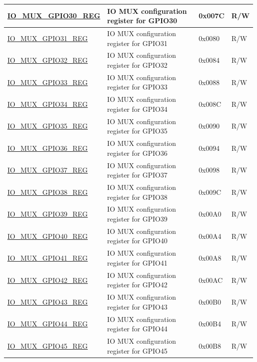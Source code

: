 \begin{longtable}{ | p{6cm} | p{7.2cm} | p{1.3cm} | p{1cm} | }
\hyperref[regdesc:IOMUXGPIONREG]{IO\_MUX\_GPIO30\_REG} & IO MUX configuration register for GPIO30 & 0x007C & R/W \\ \hline
\hyperref[regdesc:IOMUXGPIONREG]{IO\_MUX\_GPIO31\_REG} & IO MUX configuration register for GPIO31 & 0x0080 & R/W \\ \hline
\hyperref[regdesc:IOMUXGPIONREG]{IO\_MUX\_GPIO32\_REG} & IO MUX configuration register for GPIO32 & 0x0084 & R/W \\ \hline
\hyperref[regdesc:IOMUXGPIONREG]{IO\_MUX\_GPIO33\_REG} & IO MUX configuration register for GPIO33 & 0x0088 & R/W \\ \hline
\hyperref[regdesc:IOMUXGPIONREG]{IO\_MUX\_GPIO34\_REG} & IO MUX configuration register for GPIO34 & 0x008C & R/W \\ \hline
\hyperref[regdesc:IOMUXGPIONREG]{IO\_MUX\_GPIO35\_REG} & IO MUX configuration register for GPIO35 & 0x0090 & R/W \\ \hline
\hyperref[regdesc:IOMUXGPIONREG]{IO\_MUX\_GPIO36\_REG} & IO MUX configuration register for GPIO36 & 0x0094 & R/W \\ \hline
\hyperref[regdesc:IOMUXGPIONREG]{IO\_MUX\_GPIO37\_REG} & IO MUX configuration register for GPIO37 & 0x0098 & R/W \\ \hline
\hyperref[regdesc:IOMUXGPIONREG]{IO\_MUX\_GPIO38\_REG} & IO MUX configuration register for GPIO38 & 0x009C & R/W \\ \hline
\hyperref[regdesc:IOMUXGPIONREG]{IO\_MUX\_GPIO39\_REG} & IO MUX configuration register for GPIO39 & 0x00A0 & R/W \\ \hline
\hyperref[regdesc:IOMUXGPIONREG]{IO\_MUX\_GPIO40\_REG} & IO MUX configuration register for GPIO40 & 0x00A4 & R/W \\ \hline
\hyperref[regdesc:IOMUXGPIONREG]{IO\_MUX\_GPIO41\_REG} & IO MUX configuration register for GPIO41 & 0x00A8 & R/W \\ \hline
\hyperref[regdesc:IOMUXGPIONREG]{IO\_MUX\_GPIO42\_REG} & IO MUX configuration register for GPIO42 & 0x00AC & R/W \\ \hline
\hyperref[regdesc:IOMUXGPIONREG]{IO\_MUX\_GPIO43\_REG} & IO MUX configuration register for GPIO43 & 0x00B0 & R/W \\ \hline
\hyperref[regdesc:IOMUXGPIONREG]{IO\_MUX\_GPIO44\_REG} & IO MUX configuration register for GPIO44 & 0x00B4 & R/W \\ \hline
\hyperref[regdesc:IOMUXGPIONREG]{IO\_MUX\_GPIO45\_REG} & IO MUX configuration register for GPIO45 & 0x00B8 & R/W \\ \hline

\end{longtable}
